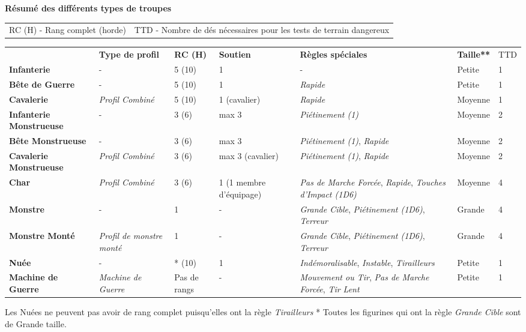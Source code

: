 {
\footnotesize

{\normalsize \noindent \textbf{Résumé des différents types de troupes}}

\renewcommand{\arraystretch}{1.1}
\setlength{\tabcolsep}{2pt}
\noindent
\begin{tabular}{m{5cm}l}
RC (H) - Rang complet (horde)
&
TTD - Nombre de dés nécessaires pour les tests de terrain dangereux
\end{tabular}
\newline \noindent
\begin{tabular}{M{3.5cm}M{1.9cm}M{0.9cm}M{2.3cm}M{3.9cm}M{1.4cm}M{0.7cm}}
 & \textbf{Type de profil} & \textbf{RC (H)} & \textbf{Soutien} & \textbf{Règles spéciales} & \textbf{Taille**} & TTD \\
 \textbf{Infanterie} & - & 5 (10) & 1 & - & Petite & 1 \\
\textbf{Bête de Guerre} & - & 5 (10) & 1 & \emph{Rapide} & Petite & 1 \\
 \textbf{Cavalerie} & \emph{Profil Combiné} & 5 (10) & 1 (cavalier) & \emph{Rapide} & Moyenne & 1 \\
\textbf{Infanterie Monstrueuse} & - & 3 (6) & max 3 & \emph{Piétinement (1)} & Moyenne & 2 \\
 \textbf{Bête Monstrueuse} & - & 3 (6) & max 3 & \emph{Piétinement (1)}, \emph{Rapide} & Moyenne & 2 \\
\textbf{Cavalerie Monstrueuse} & \emph{Profil Combiné} & 3 (6) & max 3 (cavalier) & \emph{Piétinement (1)}, \emph{Rapide} & Moyenne & 2 \\
 \textbf{Char} & \emph{Profil Combiné} & 3 (6) & 1 (1 membre d'équipage) & \emph{Pas de Marche Forcée}, \emph{Rapide}, \emph{Touches d'Impact (1D6)} & Moyenne & 4 \\
\textbf{Monstre} & - & 1 & - & \emph{Grande Cible}, \emph{Piétinement (1D6)}, \emph{Terreur} & Grande & 4 \\
 \textbf{Monstre Monté} & \emph{Profil de monstre monté} & 1 & - & \emph{Grande Cible}, \emph{Piétinement (1D6)}, \emph{Terreur} & Grande & 4 \\
\textbf{Nuée} & - & * (10) & 1 & \emph{Indémoralisable}, \emph{Instable}, \emph{Tirailleurs} & Petite & 1 \\
 \textbf{Machine de Guerre} & \emph{Machine de Guerre} & Pas de rangs & - & \emph{Mouvement ou Tir}, \emph{Pas de Marche Forcée}, \emph{Tir Lent} & Petite & 1 \\
\end{tabular}
\newline * Les Nuées ne peuvent pas avoir de rang complet puisqu'elles ont la règle  \emph{Tirailleurs}
\newline ** Toutes les figurines qui ont la règle \emph{Grande Cible} sont de Grande taille.


}
